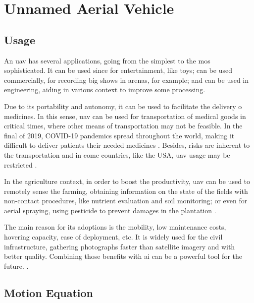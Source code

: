 \section{Unnamed Aerial Vehicle}

\subsection{Usage}

An \gls*{uav} has several applications, going from the simplest to the mos sophisticated. It can be used since for entertainment, like toys; can be used commercially, for recording big shows in arenas, for example; and can be used in engineering, aiding in various context to improve some processing.

Due to its portability and autonomy, it can be used to facilitate the delivery o medicines. In this sense, \gls*{uav} can be used for transportation of medical goods in critical times, where other means of transportation may not be feasible.
In the final of 2019, COVID-19 pandemics spread throughout the world, making it difficult to deliver patients their needed medicines \cite{ramakrishnan2023,mcphillips2022}.
Besides, risks are inherent to the transportation and in come countries, like the USA, \gls*{uav} usage may be restricted \citep{thiels2015}.

In the agriculture context, in order to boost the productivity, \gls*{uav} can be used to remotely sense the farming, obtaining information on the state of the fields with non-contact procedures, like nutrient evaluation and soil monitoring; or even for aerial spraying, using pesticide to prevent damages in the plantation \citep{delcerro2021}.

The main reason for its adoptions is the mobility, low maintenance costs, hovering capacity, ease of deployment, etc. 
It is widely used for the civil infrastructure, gathering photographs faster than  satellite imagery and with better quality. 
Combining those benefits with \gls*{ai} can be a powerful tool for the future. \citet{sivakumar2021}. 

\subsection{Motion Equation}

